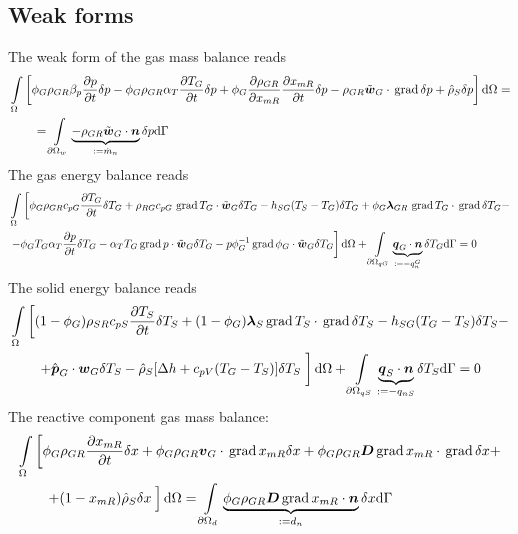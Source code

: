\subsection{Weak forms}
The weak form of the gas mass balance reads
\begin{align}
	&\int \limits_\Omega \left[ \phi_G \rho_{GR} \beta_p \frac{\partial {p}}{\partial t} \delta p - \phi_G \rho_{GR} \alpha_T \frac{\partial {T_G}}{\partial t} \delta p + \phi_G \frac{\partial \rho_{GR}}{\partial x_{mR}} \frac{\partial x_{mR}}{\partial t} \delta p - \rho_{GR} \tilde{\mbox{${\mbox{\boldmath${w}$\unboldmath}}$}}_G \cdot \,\mathrm{grad}\, \delta p + \hat{\rho}_S \delta p \right] \mathrm{d} \Omega =\nonumber\\
	&\qquad =\int \limits_{\partial \Omega_w} \underbrace{- \rho_{GR} \tilde{\mbox{${\mbox{\boldmath${w}$\unboldmath}}$}}_{G} \cdot \mbox{${\mbox{\boldmath${n}$\unboldmath}}$}}_{:= \dot{m}_n} \delta p \mathrm{d} \Gamma
\end{align}
The gas energy balance reads
\begin{align}
	&\int \limits_\Omega \left[ \phi_G \rho_{GR} c_{pG} \frac{\partial T_G}{\partial t} \delta T_G + \rho_{RG} c_{pG}\,\,\mathrm{grad}\, T_G \cdot \tilde{\mbox{${\mbox{\boldmath${w}$\unboldmath}}$}}_G \delta T_G - h_{SG} (T_S - T_G) \delta T_G + \phi_G\mbox{${\mbox{\boldmath${\lambda}$\unboldmath}}$}_{GR}\, \,\mathrm{grad}\, T_G \cdot \,\mathrm{grad}\, \delta T_G - \right.\nonumber\\
	& \left. - \phi_G T_G \alpha_T \frac{\partial p}{\partial t} \delta T_G - \alpha_T T_G \,\mathrm{grad}\, p \cdot \tilde{\mbox{${\mbox{\boldmath${w}$\unboldmath}}$}}_G  \delta T_G - p \phi_G^{-1} \,\mathrm{grad}\, \phi_G \cdot \tilde{\mbox{${\mbox{\boldmath${w}$\unboldmath}}$}}_G \delta T_G \right] \mathrm{d} \Omega + \int \limits_{\partial \Omega_{qG}} \underbrace{\mbox{${\mbox{\boldmath${q}$\unboldmath}}$}_G \cdot \mbox{${\mbox{\boldmath${n}$\unboldmath}}$}}_{:= - q_n^G} \delta T_G \mathrm{d} \Gamma= 0
\end{align}
The solid energy balance reads
\begin{align}
	&\int \limits_\Omega \left[ (1-\phi_{G}) \rho_{SR} c_{pS} \frac{\partial T_S}{\partial t} \delta T_S + (1-\phi_{G}) \mbf{\lambda}_S \grad T_S \cdot \grad \delta T_S - h_{SG} (T_G - T_S) \delta T_S - \right. \nn\\
	&\qquad \left. + \hat{\mbf{p}}_G \cdot \mbf{w}_G \delta T_S - \hat{\rho}_S [\Delta h + c_{pV} (T_G - T_S)] \delta T_S \color{white} \int \hspace{-3mm} \color{black} \right] \mathd \Omega + \int \limits_{\partial \Omega_{qS}} \underbrace{\mbf{q}_S \cdot \mbf{n}}_{:=-q_{nS}} \delta T_S \mathd \Gamma= 0
\end{align}
The reactive component gas mass balance:
\begin{align}
	&\int \limits_\Omega \left[ \phi_G \rho_{GR} \frac{\partial x_{mR}}{\partial t} \delta x + \phi_G \rho_{GR} \mbf{v}_G \cdot \grad x_{mR} \delta x + \phi_G \rho_{GR} \mbf{D} \grad x_{mR} \cdot \grad \delta x + \right. \nn\\
		&\qquad  \left. + (1 - x_{mR}) \hat{\rho}_S \delta x \color{white} \frac{}{} \color{black} \right] \mathd \Omega = \int \limits_{\partial \Omega_{d}} \underbrace{\phi_G \rho_{GR}  \mbf{D} \grad x_{mR} \cdot \mbf{n}}_{:=d_n} \delta x \mathd \Gamma
\end{align}

